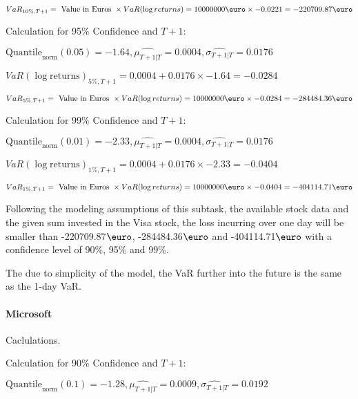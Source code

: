 \indent\indent $VaR_{10\%, T + 1} = \text{ Value in Euros } \times VaR(\log returns) = 10 000 000 \text{\euro} \times-0.0221 = -220709.87 \text{\euro}$\newline




Calculation for 95\% Confidence and $T+1$:

\indent\indent $\text{Quantile}_\text{norm}(0.05) = -1.64,\hat{\mu_{T+1|T}} = 0.0004, \hat{\sigma_{T+1|T}} = 0.0176$

\indent\indent $VaR(\log \text{returns})_{5\%, T + 1} = 0.0004 + 0.0176\times-1.64 = -0.0284$

\indent\indent $VaR_{5\%, T + 1} = \text{ Value in Euros } \times VaR(\log returns) = 10 000 000 \text{\euro} \times-0.0284 = -284484.36 \text{\euro}$\newline




Calculation for 99\% Confidence and $T+1$:

\indent\indent $\text{Quantile}_\text{norm}(0.01) = -2.33,\hat{\mu_{T+1|T}} = 0.0004, \hat{\sigma_{T+1|T}} = 0.0176$

\indent\indent $VaR(\log \text{returns})_{1\%, T + 1} = 0.0004 + 0.0176\times-2.33 = -0.0404$

\indent\indent $VaR_{1\%, T + 1} = \text{ Value in Euros } \times VaR(\log returns) = 10 000 000 \text{\euro} \times-0.0404 = -404114.71 \text{\euro}$\newline


Following the modeling assumptions of this subtask, the available stock data and the given sum invested in the Visa stock, the loss incurring over one day will be smaller than -220709.87$\text{\euro}$, -284484.36$\text{\euro}$  and -404114.71$\text{\euro}$  with a confidence level of 90\%, 95\%  and 99\%.

The due to simplicity of the model, the VaR further into the future is the same as the 1-day VaR.



\paragraph{Microsoft} Caclulations.\newline \indent 




Calculation for 90\% Confidence and $T+1$:

\indent\indent $\text{Quantile}_\text{norm}(0.1) = -1.28,\hat{\mu_{T+1|T}} = 0.0009, \hat{\sigma_{T+1|T}} = 0.0192$

